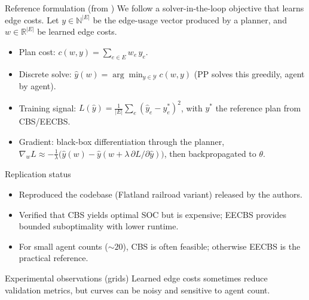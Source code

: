 \documentclass[final]{beamer}
\newlength{\colwidth}
\begin{document}
\begin{frame}[t]
\begin{columns}[t]
\begin{column}{\colwidth}


\begin{block}{Reference formulation (from \cite{captar2025learned})}
  We follow a solver-in-the-loop objective that learns edge costs.
  Let $y\in\mathbb{N}^{|E|}$ be the edge-usage vector produced by a planner, and $w\in\mathbb{R}^{|E|}$ be learned edge costs.

  \vspace{0.3em}
  \begin{itemize}
    \item Plan cost: $c(w,y)=\sum_{e\in E} w_e\, y_e$.
    \item Discrete solve: $\hat y(w)=\arg\min_{y\in\mathcal{Y}} c(w,y)$ (PP solves this greedily, agent by agent).
    \item Training signal: $L(\hat y)=\frac{1}{|E|}\sum_{e}(\hat y_e-y^*_e)^2$, with $y^*$ the reference plan from CBS/EECBS.
    \item Gradient: black-box differentiation through the planner,
      $\nabla_w L \approx -\frac{1}{\lambda}\big(\hat y(w)-\hat y(w+\lambda\,\partial L/\partial \hat y)\big)$, then backpropagated to $\theta$.
  \end{itemize}
\end{block}

\begin{block}{Replication status}
  \begin{itemize}
    \item Reproduced the codebase (Flatland railroad variant) released by the authors.
    \item Verified that CBS yields optimal SOC but is expensive; EECBS provides bounded suboptimality with lower runtime.
    \item For small agent counts ($\sim 20$), CBS is often feasible; otherwise EECBS is the practical reference.
  \end{itemize}
\end{block}

\begin{block}{Experimental observations (grids)}
  Learned edge costs sometimes reduce validation metrics, but curves can be noisy and sensitive to agent count.


\end{block}
\end{column}
\end{columns}
\end{frame}
\end{document}
